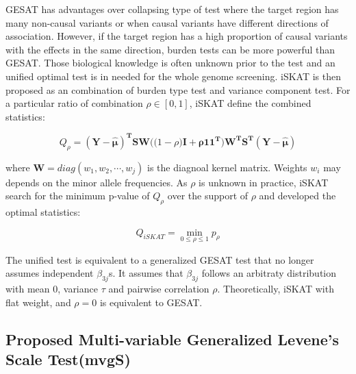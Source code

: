 \documentclass{article}
\begin{document}
GESAT has advantages over collapsing type of test where the target region has many non-causal variants or when causal variants have different directions of association. However, if the target region has a high proportion of causal variants with the effects in the same direction, burden tests can be more powerful than GESAT. Those biological knowledge is often unknown prior to the test and an unified optimal test is in needed for the whole genome screening. iSKAT is then proposed as an combination of burden type test and variance component test. For a particular ratio of combination $\rho\in[0,1]$, iSKAT define the combined statistics:

\begin{equation}
Q_\rho = \mathbf{(Y-\widehat{\mu})^TSW\big( (}1-\rho)\mathbf{I + \rho\mathbf{11^T} \big)W^TS^T(Y-\widehat{\mu})}
\end{equation}

where $\mathbf{W}=diag(w_1,w_2,\cdots, w_j)$ is the diagnoal kernel matrix. Weights $w_i$ may depends on the minor allele frequencies.  As $\rho$ is unknown in practice, iSKAT search for the minimum p-value of $Q_\rho$ over the support of $\rho$ and developed the optimal statistics:

\begin{equation}
Q_{iSKAT}=\min_{0\leq\rho\leq 1} p_\rho
\end{equation} 

The unified test is equivalent to a generalized GESAT test that no longer assumes independent $\beta_{3j}$s. It assumes that $\beta_{3j}$ follows an arbitraty distribution with mean 0, variance $\tau$ and pairwise correlation $\rho$. Theoretically, iSKAT with flat weight, and $\rho=0$ is equivalent to GESAT.





\subsection{Proposed Multi-variable Generalized Levene's Scale Test(mvgS)}
\end{document}
